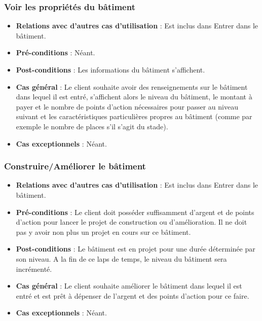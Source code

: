 \documentclass[a4paper,titlepage]{scrreprt}
\begin{document}
    \subsubsection{Voir les propriétés du bâtiment}
      \begin{itemize}
        \item \textbf{Relations avec d'autres cas d'utilisation}  : Est inclus dans Entrer dans le bâtiment.
        \item \textbf{Pré-conditions} : Néant.
        \item \textbf{Post-conditions} : Les informations du bâtiment s'affichent.
        \item \textbf{Cas général} : Le client souhaite avoir des renseignements sur le bâtiment dans lequel il est entré, s'affichent alors le niveau du bâtiment, le montant à payer et le nombre de points d'action nécessaires pour passer au niveau suivant et les caractéristiques particulières propres au bâtiment (comme par exemple le nombre de places s'il s'agit du stade).
        \item \textbf{Cas exceptionnels} : Néant.
      \end{itemize}

    \subsubsection{Construire/Améliorer le bâtiment}
      \begin{itemize}
        \item \textbf{Relations avec d'autres cas d'utilisation}  : Est inclus dans Entrer dans le bâtiment.
        \item \textbf{Pré-conditions} : Le client doit posséder suffisamment d'argent et de points d'action pour lancer le projet de construction ou d'amélioration. Il ne doit pas y avoir non plus un projet en cours sur ce bâtiment.
        \item \textbf{Post-conditions} : Le bâtiment est en projet pour une durée déterminée par son niveau. A la fin de ce laps de temps, le niveau du bâtiment sera incrémenté.
        \item \textbf{Cas général} : Le client souhaite améliorer le bâtiment dans lequel il est entré et est prêt à dépenser de l'argent et des points d'action pour ce faire.
        \item \textbf{Cas exceptionnels} : Néant.
      \end{itemize}
\end{document}

